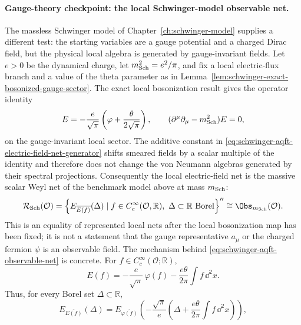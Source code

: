 \paragraph{Gauge-theory checkpoint: the local Schwinger-model observable net.}
The massless Schwinger model of Chapter~\ref{ch:schwinger-model} supplies a
different test: the starting variables are a gauge potential and a charged
Dirac field, but the physical local algebra is generated by gauge-invariant
fields.  Let \(e>0\) be the dynamical charge, let
\(m_{\rm Sch}^2=e^2/\pi\), and fix a local electric-flux branch and a value of
the theta parameter as in Lemma~\ref{lem:schwinger-exact-bosonized-gauge-sector}.
The exact local bosonization result gives the operator identity
\begin{equation}
  E
  =
  -\frac{e}{\sqrt\pi}
  \left(\varphi+\frac{\theta}{2\sqrt\pi}\right),
  \qquad
  (\partial^\mu\partial_\mu-m_{\rm Sch}^2)E=0,
  \label{eq:schwinger-aqft-electric-field-net-generator}
\end{equation}
on the gauge-invariant local sector.  The additive constant in
\eqref{eq:schwinger-aqft-electric-field-net-generator} shifts smeared fields
by a scalar multiple of the identity and therefore does not change the von
Neumann algebras generated by their spectral projections.  Consequently the
local electric-field net is the massive scalar Weyl net of the benchmark
model above at mass \(m_{\rm Sch}\):
\begin{equation}
  \mathcal R_{\rm Sch}(\mathcal O)
  =
  \left\{
    E_{\overline{E(f)}}(\Delta)
    \mid f\in C_c^\infty(\mathcal O,\mathbb R),\
       \Delta\subset\mathbb R\text{ Borel}
  \right\}''
  \cong
  \Obs_{m_{\rm Sch}}(\mathcal O).
  \label{eq:schwinger-aqft-observable-net}
\end{equation}
This is an equality of represented local nets after the local bosonization
map has been fixed; it is not a statement that the gauge representative
\(a_\mu\) or the charged fermion \(\psi\) is an observable field.
The mechanism behind \eqref{eq:schwinger-aqft-observable-net} is concrete.
For \(f\in C_c^\infty(\mathcal O;\mathbb R)\),
\begin{equation}
  E(f)
  =
  -\frac{e}{\sqrt\pi}\,\varphi(f)
  -\frac{e\theta}{2\pi}\int f\,\dd^2x .
  \label{eq:schwinger-aqft-electric-smeared-coordinate}
\end{equation}
Thus, for every Borel set \(\Delta\subset\mathbb R\),
\[
  E_{\overline{E(f)}}(\Delta)
  =
  E_{\overline{\varphi(f)}}\!\left(
    -\frac{\sqrt\pi}{e}
    \left(\Delta+\frac{e\theta}{2\pi}\int f\,\dd^2x\right)
  \right),
\]
